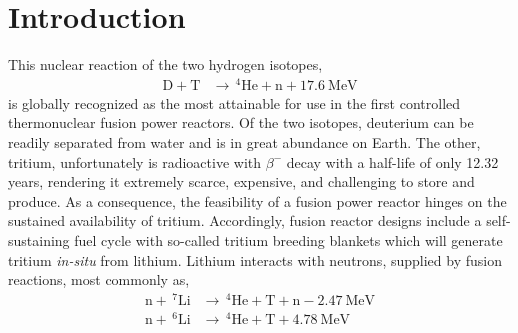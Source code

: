 

\chapter{Introduction} \label{sec:introduction}
This nuclear reaction of the two hydrogen isotopes,
\begin{align}
\mathrm{D} + \mathrm{T}&\xrightarrow{}\,^4\mathrm{He}+\mathrm{n} + \SI{17.6}{\mega\electronvolt}
\end{align}
is globally recognized as the most attainable for use in the first controlled thermonuclear fusion power reactors. Of the two isotopes, deuterium can be readily separated from water and is in great abundance on Earth. The other, tritium, unfortunately is radioactive with $\beta^-$ decay with a half-life of only 12.32 years, rendering it extremely scarce, expensive, and challenging to store and produce. As a consequence, the feasibility of a fusion power reactor hinges on the sustained availability of tritium. Accordingly, fusion reactor designs include a self-sustaining fuel cycle with so-called tritium breeding blankets which will generate tritium \textit{in-situ} from lithium. Lithium interacts with neutrons, supplied by fusion reactions, most commonly as,
\begin{align}
\mathrm{n} + \,^7\mathrm{Li} &\xrightarrow \,\,^4\mathrm{He} + \mathrm{T} +\mathrm{n} -\SI{2.47}{\mega\electronvolt}\label{eq:Li7T}\\
\mathrm{n} + \,^6\mathrm{Li} &\xrightarrow \,\,^4\mathrm{He} + \mathrm{T} + \SI{4.78}{\mega\electronvolt} \label{eq:Li6T}
\end{align}

